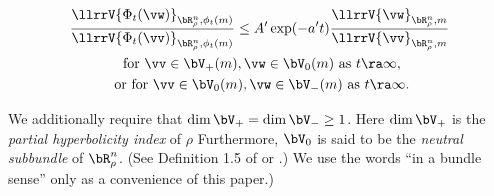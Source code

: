 \begin{definition}
\begin{enumerate}
\begin{enumerate}
\begin{multline}
				\frac{\llrrV{\Phi_{t}(\vw)}_{\bR^n_\rho,\phi_{t}(m)}}{\llrrV{\Phi_{t}(\vv)}_{\bR^n_\rho, \phi_{t}(m)}} 
				\leq A' \exp(-a't)\frac{\llrrV{\vw}_{\bR^n_\rho, m}}{\llrrV{\vv}_{\bR^n_\rho, m}} \\
				\text{ for } \vv \in \bV_+(m), \vw \in \bV_0(m)
				\text{ as } t \ra \infty, \\
				 \text{ or for }
				 \vv \in \bV_0(m), \vw \in \bV_-(m)
				 \text{ as } t \ra \infty.
			\end{multline} 
		\end{enumerate} 
	\end{enumerate}
	We additionally require that $\dim \bV_+ = \dim \bV_- \geq 1$.  
	Here $\dim \bV_+$ is the {\em partial hyperbolicity index} of $\rho$
 Furthermore, $\bV_0$ is said to be the {\em neutral subbundle} of $\bR^n_{\rho}$. 
	(See Definition 1.5 of \cite{CP} or \cite{BLM}.)
We use the words ``in a bundle sense'' only as a convenience of this paper.)
\end{definition} 





